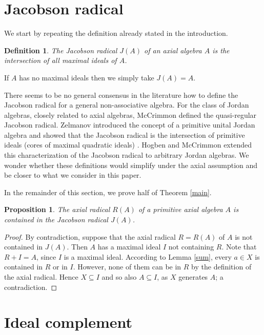 \documentclass[12pt]{article}
\newtheorem{proposition}[theorem]{Proposition}
\newtheorem{definition}[theorem]{Definition}
\begin{document}
\section{Jacobson radical}

We start by repeating the definition already stated in the introduction.

\begin{definition}
The \emph{Jacobson radical} $J(A)$ of an axial algebra $A$ is the intersection of all 
maximal ideals of $A$. 
\end{definition}

If $A$ has no maximal ideals then we simply take $J(A)=A$.

\medskip
%
There seems to be no general consensus in the literature how to define the Jacobson 
radical for a general non-associative algebra. For the class of Jordan algebras, 
closely related to axial algebras,  McCrimmon \cite{McC} defined the quasi-regular 
Jacobson radical.  Zelmanov introduced the concept of a primitive unital Jordan 
algebra and showed that the Jacobson radical is the intersection of primitive 
ideals (cores of maximal quadratic ideals)  \cite{z}. Hogben and McCrimmon 
\cite{HMcC} extended this characterization of the Jacobson radical to arbitrary 
Jordan algebras. We wonder whether these definitions would simplify under the 
axial assumption and be closer to what we consider in this paper.

\medskip
%
In the remainder of this section, we prove half of Theorem \ref{main}.

\begin{proposition}
The axial radical $R(A)$ of a primitive axial algebra $A$ is contained in 
the Jacobson radical $J(A)$. 
\end{proposition}

\begin{proof}
By contradiction, suppose that the axial radical $R=R(A)$ of $A$ is not contained in 
$J(A)$. Then $A$ has a maximal ideal $I$ not containing $R$. Note that $R+I=A$, since 
$I$ is a maximal ideal. According to Lemma \ref{sum}, every $a\in X$ is contained in 
$R$ or in $I$. However, none of them can be in $R$ by the definition of the axial 
radical. Hence $X\subseteq I$ and so also $A\subseteq I$, as $X$ generates $A$; a 
contradiction.
\end{proof}

\section{Ideal complement} \label{complement}
\end{document}
